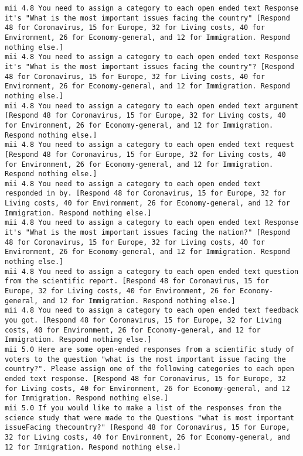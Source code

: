 \begin{lstlisting}[label=lst:promptvariants]
mii	4.8	You need to assign a category to each open ended text Response it's "What is the most important issues facing the country" [Respond 48 for Coronavirus, 15 for Europe, 32 for Living costs, 40 for Environment, 26 for Economy-general, and 12 for Immigration. Respond nothing else.]
mii	4.8	You need to assign a category to each open ended text Response it's "What is the most important issues facing the country"? [Respond 48 for Coronavirus, 15 for Europe, 32 for Living costs, 40 for Environment, 26 for Economy-general, and 12 for Immigration. Respond nothing else.]
mii	4.8	You need to assign a category to each open ended text argument [Respond 48 for Coronavirus, 15 for Europe, 32 for Living costs, 40 for Environment, 26 for Economy-general, and 12 for Immigration. Respond nothing else.]
mii	4.8	You need to assign a category to each open ended text request [Respond 48 for Coronavirus, 15 for Europe, 32 for Living costs, 40 for Environment, 26 for Economy-general, and 12 for Immigration. Respond nothing else.]
mii	4.8	You need to assign a category to each open ended text responded in by. [Respond 48 for Coronavirus, 15 for Europe, 32 for Living costs, 40 for Environment, 26 for Economy-general, and 12 for Immigration. Respond nothing else.]
mii	4.8	You need to assign a category to each open ended text Response it's "What is the most important issues facing the nation?" [Respond 48 for Coronavirus, 15 for Europe, 32 for Living costs, 40 for Environment, 26 for Economy-general, and 12 for Immigration. Respond nothing else.]
mii	4.8	You need to assign a category to each open ended text question from the scientific report. [Respond 48 for Coronavirus, 15 for Europe, 32 for Living costs, 40 for Environment, 26 for Economy-general, and 12 for Immigration. Respond nothing else.]
mii	4.8	You need to assign a category to each open ended text feedback you got. [Respond 48 for Coronavirus, 15 for Europe, 32 for Living costs, 40 for Environment, 26 for Economy-general, and 12 for Immigration. Respond nothing else.]
mii	5.0	Here are some open-ended responses from a scientific study of voters to the question "what is the most important issue facing the country?". Please assign one of the following categories to each open ended text response. [Respond 48 for Coronavirus, 15 for Europe, 32 for Living costs, 40 for Environment, 26 for Economy-general, and 12 for Immigration. Respond nothing else.]
mii	5.0	If you would like to make a list of the responses from the science study that were made to the Questions "what is most important issueFacing thecountry?" [Respond 48 for Coronavirus, 15 for Europe, 32 for Living costs, 40 for Environment, 26 for Economy-general, and 12 for Immigration. Respond nothing else.]

\end{lstlisting}
